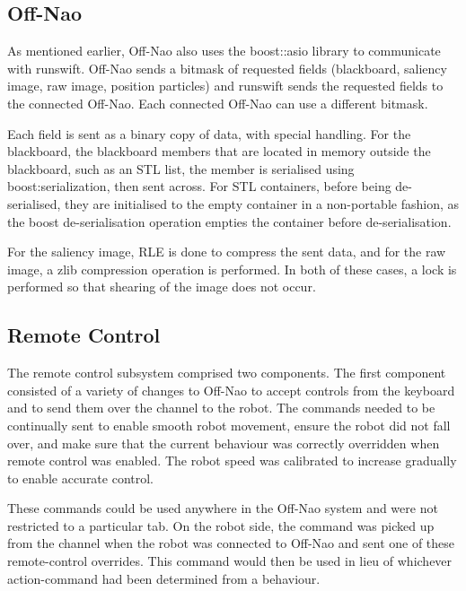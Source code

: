 \documentclass[pdftex,11pt,a4paper]{report}
\begin{document}
\begin{notesfornextyear}
\subsection{Off-Nao}

As mentioned earlier, Off-Nao also uses the boost::asio library to communicate
with runswift.  Off-Nao sends a bitmask of requested fields (blackboard,
saliency image, raw image, position particles) and runswift sends the requested
fields to the connected Off-Nao.  Each connected Off-Nao can use a different
bitmask.

Each field is sent as a binary copy of data, with special handling.  For the
blackboard, the blackboard members that are located in memory outside the
blackboard, such as an STL list, the member is serialised using
boost:serialization, then sent across.  For STL containers, before being
de-serialised, they are initialised to the empty container in a non-portable
fashion, as the boost de-serialisation operation empties the container before
de-serialisation.

For the saliency image, RLE is done to compress the sent data, and for the raw
image, a zlib compression operation is performed.  In both of these cases, a
lock is performed so that shearing of the image does not occur.
\end{notesfornextyear}

\subsection{Remote Control}

The remote control subsystem comprised two components. The first component 
consisted of a variety of changes to Off-Nao to accept controls from the 
keyboard and to send them over the channel to the robot. The commands needed 
to be continually sent to enable smooth robot movement, ensure the robot did 
not fall over, and make sure that the current behaviour was correctly 
overridden when remote control was enabled. The robot speed was calibrated to
increase gradually to enable accurate control.

These commands could be used anywhere in the Off-Nao system and were not 
restricted to a particular tab. On the robot side, the command was picked up
from the channel when the robot was connected to Off-Nao and sent one of these
remote-control overrides. This command would then be used in lieu of whichever
action-command had been determined from a behaviour. 
\end{document}
